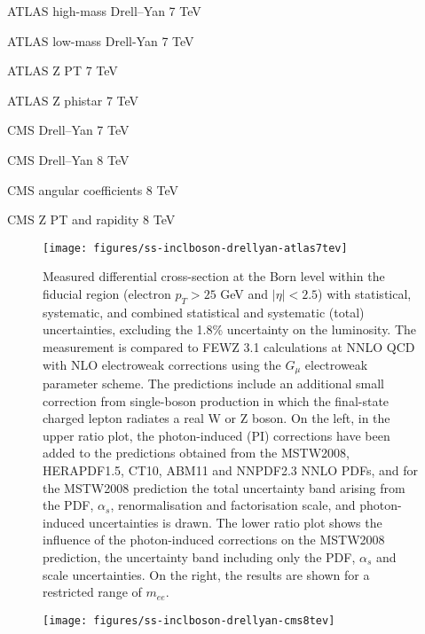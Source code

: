 ATLAS high-mass Drell--Yan 7 TeV~\cite{Aad:2013iua} 

ATLAS low-mass Drell-Yan 7 TeV~\cite{Aad:2014qja}

ATLAS Z PT 7 TeV~\cite{Aad:2014xaa}

ATLAS Z phistar 7 TeV~\cite{Aad:2012wfa}

CMS Drell--Yan 7 TeV~\cite{Chatrchyan:2013tia}

CMS Drell--Yan 8 TeV~\cite{CMS:2014jea}

CMS angular coefficients 8 TeV~\cite{Khachatryan:2015paa}

CMS Z PT and rapidity 8 TeV~\cite{Khachatryan:2015oaa}

\begin{figure}[p]
    \centering
    \texttt{[image: figures/ss-inclboson-drellyan-atlas7tev]}
    \caption{Measured differential cross-section at the Born level within the fiducial region (electron $p_T > 25$ GeV and $|\eta| < 2.5$) with statistical, systematic, and combined statistical and systematic (total) uncertainties, excluding the 1.8\% uncertainty on the luminosity. The measurement is compared to FEWZ 3.1 calculations at NNLO QCD with NLO electroweak corrections using the $G_{\mu}$ electroweak parameter scheme. The predictions include an additional small correction from single-boson production in which the final-state charged lepton radiates a real W or Z boson. On the left, in the upper ratio plot, the photon-induced (PI) corrections have been added to the predictions obtained from the MSTW2008, HERAPDF1.5, CT10, ABM11 and NNPDF2.3 NNLO PDFs, and for the MSTW2008 prediction the total uncertainty band arising from the PDF, $\alpha_s$, renormalisation and factorisation scale, and photon-induced uncertainties is drawn. The lower ratio plot shows the influence of the photon-induced corrections on the MSTW2008 prediction, the uncertainty band including only the PDF, $\alpha_s$ and scale uncertainties. On the right, the results are shown for a restricted range of $m_{ee}$.}
    \label{fig:ss-inclboson-drellyan-atlas7tev}
\end{figure}

\begin{figure}[p]
    \centering
    \texttt{[image: figures/ss-inclboson-drellyan-cms8tev]}
    \caption{}
    \label{fig:ss-inclboson-drellyan-cms8tev}
\end{figure}

